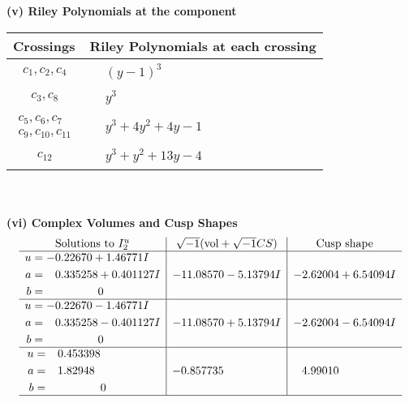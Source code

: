 \documentclass[1p]{elsarticle_modified}
\theoremstyle{definition}
\newcommand{\I}{\sqrt{-1}}
\begin{document}
\newpage\renewcommand{\arraystretch}{1}
\flushleft \textbf{(v) Riley Polynomials at the component}\newline \\
\begin{tabular}{m{50pt}|m{274pt}}
Crossings & \hspace{64pt}Riley Polynomials at each crossing \\
\hline $$\begin{aligned}c_{1},c_{2},c_{4}\end{aligned}$$&$\begin{aligned}
&(y-1)^3
\end{aligned}$\\
\hline $$\begin{aligned}c_{3},c_{8}\end{aligned}$$&$\begin{aligned}
&y^3
\end{aligned}$\\
\hline $$\begin{aligned}c_{5},c_{6},c_{7}\\c_{9},c_{10},c_{11}\end{aligned}$$&$\begin{aligned}
&y^3+4 y^2+4 y-1
\end{aligned}$\\
\hline $$\begin{aligned}c_{12}\end{aligned}$$&$\begin{aligned}
&y^3+y^2+13 y-4
\end{aligned}$\\
\hline
\end{tabular}\\~\\
\newpage\flushleft \textbf{(vi) Complex Volumes and Cusp Shapes}
$$\begin{array}{c|c|c}  
\text{Solutions to }I^u_{2}& \I (\text{vol} + \sqrt{-1}CS) & \text{Cusp shape}\\
 \hline 
\begin{aligned}
u &= -0.22670 + 1.46771 I \\
a &= \phantom{-}0.335258 + 0.401127 I \\
b &= \phantom{-0.000000 } 0\end{aligned}
 & -11.08570 - 5.13794 I & -2.62004 + 6.54094 I \\ \hline\begin{aligned}
u &= -0.22670 - 1.46771 I \\
a &= \phantom{-}0.335258 - 0.401127 I \\
b &= \phantom{-0.000000 } 0\end{aligned}
 & -11.08570 + 5.13794 I & -2.62004 - 6.54094 I \\ \hline\begin{aligned}
u &= \phantom{-}0.453398\phantom{ +0.000000I} \\
a &= \phantom{-}1.82948\phantom{ +0.000000I} \\
b &= \phantom{-0.000000 } 0\end{aligned}
 & -0.857735\phantom{ +0.000000I} & \phantom{-}4.99010\phantom{ +0.000000I}\\
 \hline 
 \end{array}$$\newpage\newpage\renewcommand{\arraystretch}{1}
\end{document}
